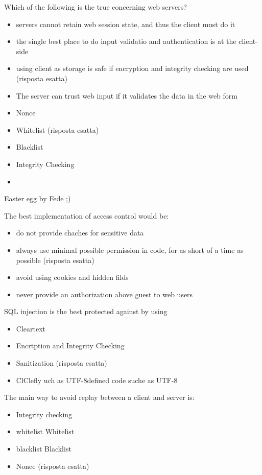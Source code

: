 Which of the following is the true concerning web servers?
\begin{itemize}
\item servers cannot retain web session state, and thus the client must do it
\item the single best place to do input validatio and authentication is at the 
client-side
\item using client as storage is safe if encryption and integrity checking are 
used (risposta esatta)
\item The server can trust web input if it validates the data in the web form
\end{itemize}




\begin{itemize}
\item Nonce
\item Whitelist (risposta esatta)
\item Blacklist
\item Integrity Checking
\item
\end{itemize}


Easter egg by Fede ;)

The best implementation of access control would be:
\begin{itemize}
\item do not provide chaches for sensitive data
\item always use minimal possible permission in code, for as short of a time as 
possible (risposta esatta)
\item avoid using cookies and hidden filds
\item never provide an authorization above guest to web users
\end{itemize}

SQL injection is the best protected against by using
\begin{itemize}
\item Cleartext
\item Encrtption and Integrity Checking
\item Sanitization (risposta esatta)
\item ClClefly uch as UTF-8defined code suche as UTF-8
\end{itemize}

The main way to avoid replay between a client and server is:
\begin{itemize}
\item Integrity checking
\item whitelist Whitelist
\item blacklist Blacklist
\item Nonce (risposta esatta)
\end{itemize}


